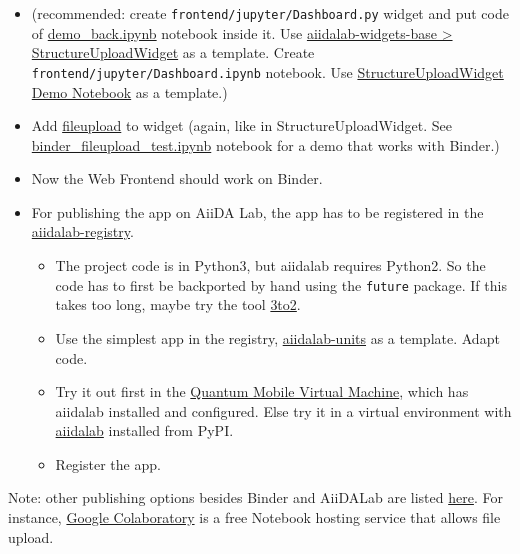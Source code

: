 \begin{itemize}
\tightlist
\item
  (recommended: create \texttt{frontend/jupyter/Dashboard.py} widget and
  put code of
  \href{./frontend/jupyter/demo/demo_backend.ipynb}{demo\_back.ipynb}
  notebook inside it. Use
  \href{https://github.com/aiidalab/aiidalab-widgets-base/blob/master/aiidalab_widgets_base/structures.py}{aiidalab-widgets-base
  \textgreater{} StructureUploadWidget} as a template. Create
  \texttt{frontend/jupyter/Dashboard.ipynb} notebook. Use
  \href{https://github.com/aiidalab/aiidalab-widgets-base/blob/master/structures.ipynb}{StructureUploadWidget
  Demo Notebook} as a template.)
\item
  Add \href{https://pypi.org/project/fileupload/}{fileupload} to widget
  (again, like in StructureUploadWidget. See
  \href{./frontend/jupyter/demo/binder_fileupload_test.ipynb}{binder\_fileupload\_test.ipynb}
  notebook for a demo that works with Binder.)
\item
  Now the Web Frontend should work on Binder.
\item
  For publishing the app on AiiDA Lab, the app has to be registered in
  the
  \href{https://github.com/aiidalab/aiidalab-registry}{aiidalab-registry}.

  \begin{itemize}
  \tightlist
  \item
    The project code is in Python3, but aiidalab requires Python2. So
    the code has to first be backported by hand using the
    \texttt{future} package. If this takes too long, maybe try the tool
    \href{https://pypi.org/project/3to2/}{3to2}.
  \item
    Use the simplest app in the registry,
    \href{https://github.com/aiidalab/aiidalab-units}{aiidalab-units} as
    a template. Adapt code.
  \item
    Try it out first in the
    \href{https://www.materialscloud.org/work/quantum-mobile}{Quantum
    Mobile Virtual Machine}, which has aiidalab installed and
    configured. Else try it in a virtual environment with
    \href{https://pypi.org/project/aiidalab/}{aiidalab} installed from
    PyPI.
  \item
    Register the app.
  \end{itemize}
\end{itemize}

Note: other publishing options besides Binder and AiiDALab are listed
\href{https://github.com/markusschanta/awesome-jupyter}{here}. For
instance, \href{http://colab.research.google.com/}{Google Colaboratory}
is a free Notebook hosting service that allows file upload.


